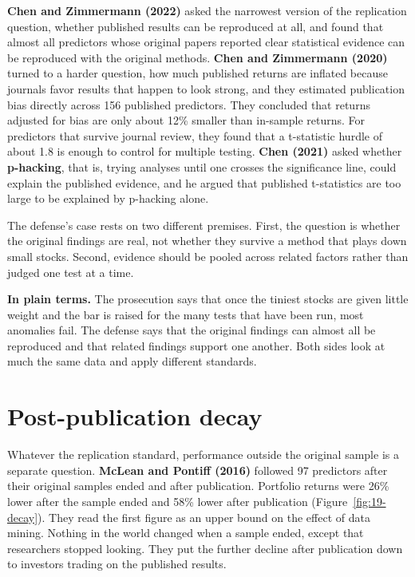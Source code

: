 \textbf{Chen and Zimmermann (2022)} asked the narrowest version of the replication question, whether published results can be reproduced at all, and found that almost all predictors whose original papers reported clear statistical evidence can be reproduced with the original methods. \textbf{Chen and Zimmermann (2020)} turned to a harder question, how much published returns are inflated because journals favor results that happen to look strong, and they estimated publication bias directly across 156 published predictors. They concluded that returns adjusted for bias are only about 12\% smaller than in-sample returns. For predictors that survive journal review, they found that a t-statistic hurdle of about 1.8 is enough to control for multiple testing. \textbf{Chen (2021)} asked whether \textbf{p-hacking}, that is, trying analyses until one crosses the significance line, could explain the published evidence, and he argued that published t-statistics are too large to be explained by p-hacking alone.

The defense's case rests on two different premises. First, the question is whether the original findings are real, not whether they survive a method that plays down small stocks. Second, evidence should be pooled across related factors rather than judged one test at a time.

\noindent\textbf{In plain terms.} The prosecution says that once the tiniest stocks are given little weight and the bar is raised for the many tests that have been run, most anomalies fail. The defense says that the original findings can almost all be reproduced and that related findings support one another. Both sides look at much the same data and apply different standards.

\section{Post-publication decay}
\label{sec:19-decay}

Whatever the replication standard, performance outside the original sample is a separate question. \textbf{McLean and Pontiff (2016)} followed 97 predictors after their original samples ended and after publication. Portfolio returns were 26\% lower after the sample ended and 58\% lower after publication (Figure~\ref{fig:19-decay}). They read the first figure as an upper bound on the effect of data mining. Nothing in the world changed when a sample ended, except that researchers stopped looking. They put the further decline after publication down to investors trading on the published results.

